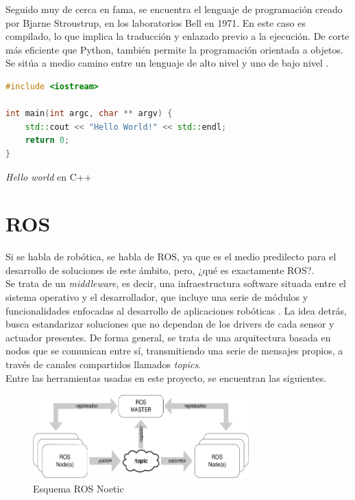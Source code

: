 Seguido muy de cerca en fama, se encuentra el lenguaje de programación creado por Bjarne Stroustrup, en los laboratorios Bell en 1971. En este caso es compilado, lo que implica la traducción y enlazado previo a la ejecución. De corte más eficiente que Python, también permite la programación orientada a objetos. Se sitúa a medio camino entre un lenguaje de alto nivel y uno de bajo nivel \cite{c-history}.\\

\begin{code}[H]
\begin{lstlisting}[language=C++]
#include <iostream>

int main(int argc, char ** argv) {
    std::cout << "Hello World!" << std::endl;
    return 0;
}
\end{lstlisting}
\caption[Hello world en C++]{\emph{Hello world} en C++}
\label{cod:helloworld_cplusplus}
\end{code}

\section{\ac{ROS}}
\label{sec:ros}

Si se habla de robótica, se habla de \ac{ROS}, ya que es el medio predilecto para el desarrollo de soluciones de este ámbito, pero, ¿qué es exactamente \ac{ROS}?.\\

Se trata de un \emph{middleware}, es decir, una infraestructura software situada entre el sistema operativo y el desarrollador, que incluye una serie de módulos y funcionalidades enfocadas al desarrollo de aplicaciones robóticas \cite{middleware-def} \cite{ros-def}. La idea detrás, busca estandarizar soluciones que no dependan de los drivers de cada sensor y actuador presentes. De forma general, se trata de una arquitectura basada en nodos que se comunican entre sí, transmitiendo una serie de mensajes propios, a través de canales compartidos llamados \emph{topics}.\\

Entre las herramientas usadas en este proyecto, se encuentran las siguientes.

\begin{figure} [H]
	\begin{center}
	\includegraphics[height=3.25cm]{imagenes/cap3/1_ros_esquema.png}
	\end{center}
	\caption[Esquema ROS Noetic]{Esquema ROS Noetic}
	\label{fig:ros}
\end{figure}

